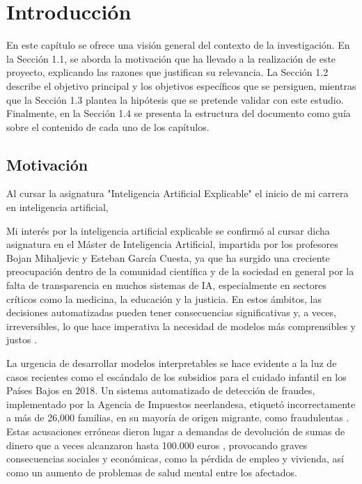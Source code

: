 \chapter{Introducción}

En este capítulo se ofrece una visión general del contexto de la investigación. En la Sección 1.1, se aborda la motivación que ha llevado a la realización de este proyecto, explicando las razones que justifican su relevancia. La Sección 1.2 describe el objetivo principal y los objetivos específicos que se persiguen, mientras que la Sección 1.3 plantea la hipótesis que se pretende validar con este estudio. Finalmente, en la Sección 1.4 se presenta la estructura del documento como guía sobre el contenido de cada uno de los capítulos.

\section{Motivación}

Al cursar la asignatura "Inteligencia Artificial Explicable" el inicio de mi carrera en inteligencia artificial, 


Mi interés por la inteligencia artificial explicable se confirmó al cursar dicha asignatura en el Máster de Inteligencia Artificial, impartida por los profesores Bojan Mihaljevic y Esteban García Cuesta, ya que ha surgido una creciente preocupación dentro de la comunidad científica y de la sociedad en general por la falta de transparencia en muchos sistemas de IA, especialmente en sectores críticos como la medicina, la educación y la justicia. En estos ámbitos, las decisiones automatizadas pueden tener consecuencias significativas y, a veces, irreversibles, lo que hace imperativa la necesidad de modelos más comprensibles y justos \cite{samek-2019}.

La urgencia de desarrollar modelos interpretables se hace evidente a la luz de casos recientes como el escándalo de los subsidios para el cuidado infantil en los Países Bajos en 2018. Un sistema automatizado de detección de fraudes, implementado por la Agencia de Impuestos neerlandesa, etiquetó incorrectamente a más de 26,000 familias, en su mayoría de origen migrante, como fraudulentas \cite{amnesty-2021, bbc-2021}. Estas acusaciones erróneas dieron lugar a demandas de devolución de sumas de dinero que a veces alcanzaron hasta 100.000 euros \cite{euronews-2021}, provocando graves consecuencias sociales y económicas, como la pérdida de empleo y vivienda, así como un aumento de problemas de salud mental entre los afectados.

